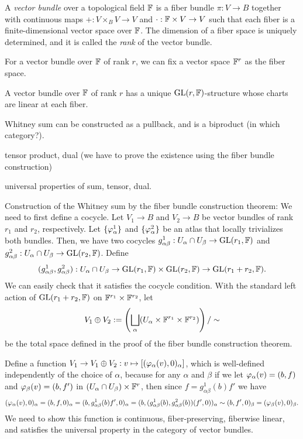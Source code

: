 \documentclass{../../large}
\begin{document}
\begin{prb}
A \emph{vector bundle} over a topological field $\mathbb{F}$ is a fiber bundle $\pi:V\to B$ together with continuous maps $+:V\times_BV\to V$ and $\cdot:\mathbb{F}\times V\to V$ such that each fiber is a finite-dimensional vector space over $\mathbb{F}$.
The dimension of a fiber space is uniquely determined, and it is called the \emph{rank} of the vector bundle.

For a vector bundle over $\mathbb{F}$ of rank $r$, we can fix a vector space $\mathbb{F}^r$ as the fiber space.
\begin{parts}
\item A vector bundle over $\mathbb{F}$ of rank $r$ has a unique $\mathrm{GL}(r,\mathbb{F})$-structure whose charts are linear at each fiber.
\item Whitney sum can be constructed as a pullback, and is a biproduct (in which category?).
\item tensor product, dual (we have to prove the existence using the fiber bundle construction)
\item universal properties of sum, tensor, dual.
\end{parts}
\end{prb}
\begin{pf}
Construction of the Whitney sum by the fiber bundle construction theorem:
We need to first define a cocycle.
Let $V_1\to B$ and $V_2\to B$ be vector bundles of rank $r_1$ and $r_2$, respectively.
Let $\{\varphi_\alpha^1\}$ and $\{\varphi_\alpha^2\}$ be an atlas that locally trivializes both bundles.
Then, we have two cocycles $g_{\alpha\beta}^1:U_\alpha\cap U_\beta\to\mathrm{GL}(r_1,\mathbb{F})$ and $g_{\alpha\beta}^2:U_\alpha\cap U_\beta\to\mathrm{GL}(r_2,\mathbb{F})$.
Define
\[(g_{\alpha\beta}^1,g_{\alpha\beta}^2):U_\alpha\cap U_\beta\to\mathrm{GL}(r_1,\mathbb{F})\times\mathrm{GL}(r_2,\mathbb{F})\to\mathrm{GL}(r_1+r_2,\mathbb{F}).\]
We can easily check that it satisfies the cocycle condition.
With the standard left action of $\mathrm{GL}(r_1+r_2,\mathbb{F})$ on $\mathbb{F}^{r_1}\times\mathbb{F}^{r_2}$, let
\[V_1\oplus V_2:=\left(\bigsqcup_\alpha(U_\alpha\times\mathbb{F}^{r_1}\times\mathbb{F}^{r_2})\right)/\sim\]
be the total space defined in the proof of the fiber bundle construction theorem.

Define a function $V_1\to V_1\oplus V_2:v\mapsto[(\varphi_\alpha(v),0)_\alpha]$, which is well-defined independently of the choice of $\alpha$, because for any $\alpha$ and $\beta$ if we let $\varphi_\alpha(v)=(b,f)$ and $\varphi_\beta(v)=(b,f')$ in $(U_\alpha\cap U_\beta)\times\mathbb{F}^r$, then since $f=g_{\alpha\beta}^1(b)f'$ we have
\[(\varphi_\alpha(v),0)_\alpha=(b,f,0)_\alpha=(b,g_{\alpha\beta}^1(b)f',0)_\alpha=(b,(g_{\alpha\beta}^1(b),g_{\alpha\beta}^2(b))(f',0))_\alpha\sim(b,f',0)_\beta=(\varphi_\beta(v),0)_\beta.\]
We need to show this function is continuous, fiber-preserving, fiberwise linear, and satisfies the universal property in the category of vector bundles.
\end{pf}
\end{document}
